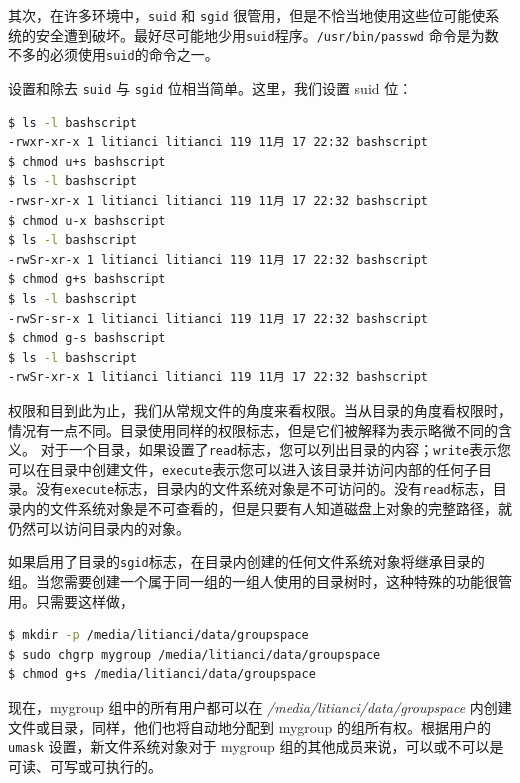 \documentclass[doctor,openright,twoside]{sjtuthesis}
\newcommand{\passthrough}[1]{#1}
\theoremstyle{plain}
\theoremstyle{definition}
\theoremstyle{remark}
\theoremstyle{ocrenumbox}
\theoremstyle{plain}
\begin{document}
其次，在许多环境中，\passthrough{\lstinline!suid!} 和 \passthrough{\lstinline!sgid!} 很管用，但是不恰当地使用这些位可能使系统的安全遭到破坏。最好尽可能地少用\passthrough{\lstinline!suid!}程序。\passthrough{\lstinline!/usr/bin/passwd!} 命令是为数不多的必须使用\passthrough{\lstinline!suid!}的命令之一。

设置和除去 \passthrough{\lstinline!suid!} 与 \passthrough{\lstinline!sgid!} 位相当简单。这里，我们设置 suid 位：

\begin{lstlisting}[language=bash]
$ ls -l bashscript 
-rwxr-xr-x 1 litianci litianci 119 11月 17 22:32 bashscript
$ chmod u+s bashscript 
$ ls -l bashscript 
-rwsr-xr-x 1 litianci litianci 119 11月 17 22:32 bashscript
$ chmod u-x bashscript 
$ ls -l bashscript 
-rwSr-xr-x 1 litianci litianci 119 11月 17 22:32 bashscript
$ chmod g+s bashscript 
$ ls -l bashscript 
-rwSr-sr-x 1 litianci litianci 119 11月 17 22:32 bashscript
$ chmod g-s bashscript 
$ ls -l bashscript 
-rwSr-xr-x 1 litianci litianci 119 11月 17 22:32 bashscript
\end{lstlisting}

权限和目到此为止，我们从常规文件的角度来看权限。当从目录的角度看权限时，情况有一点不同。目录使用同样的权限标志，但是它们被解释为表示略微不同的含义。 对于一个目录，如果设置了\passthrough{\lstinline!read!}标志，您可以列出目录的内容；\passthrough{\lstinline!write!}表示您可以在目录中创建文件，\passthrough{\lstinline!execute!}表示您可以进入该目录并访问内部的任何子目录。没有\passthrough{\lstinline!execute!}标志，目录内的文件系统对象是不可访问的。没有\passthrough{\lstinline!read!}标志，目录内的文件系统对象是不可查看的，但是只要有人知道磁盘上对象的完整路径，就仍然可以访问目录内的对象。

如果启用了目录的\passthrough{\lstinline!sgid!}标志，在目录内创建的任何文件系统对象将继承目录的组。当您需要创建一个属于同一组的一组人使用的目录树时，这种特殊的功能很管用。只需要这样做，

\begin{lstlisting}[language=bash]
$ mkdir -p /media/litianci/data/groupspace
$ sudo chgrp mygroup /media/litianci/data/groupspace
$ chmod g+s /media/litianci/data/groupspace
\end{lstlisting}

现在，mygroup 组中的所有用户都可以在 \emph{/media/litianci/data/groupspace} 内创建文件或目录，同样，他们也将自动地分配到 mygroup 的组所有权。根据用户的 \passthrough{\lstinline!umask!} 设置，新文件系统对象对于 mygroup 组的其他成员来说，可以或不可以是可读、可写或可执行的。
\end{document}
